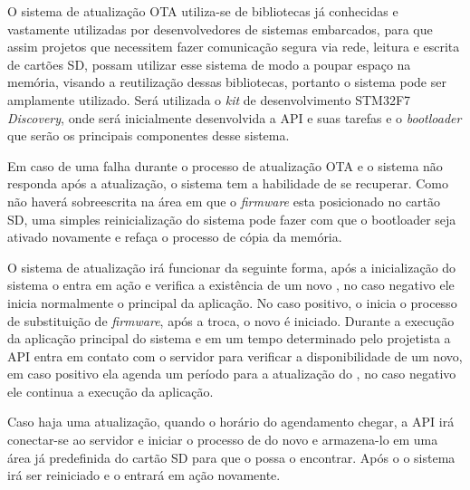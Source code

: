 O sistema de atualização OTA utiliza-se de bibliotecas já conhecidas e vastamente utilizadas por desenvolvedores de sistemas embarcados, para que assim projetos que necessitem fazer comunicação segura via rede, leitura e escrita de cartões SD, possam utilizar esse sistema de modo a poupar espaço na memória, visando a reutilização dessas bibliotecas, portanto o sistema pode ser amplamente utilizado. Será utilizada o \textit{kit} de desenvolvimento STM32F7 \textit{Discovery}, onde será inicialmente desenvolvida a API e suas tarefas e o \textit{bootloader} que serão os principais componentes desse sistema.

Em caso de uma falha durante o processo de atualização OTA e o sistema não responda após a atualização, o sistema tem a habilidade de se recuperar. Como não haverá sobreescrita na área em que o \textit{firmware} esta posicionado no cartão SD, uma simples reinicialização do sistema pode fazer com que o bootloader seja ativado novamente e refaça o processo de cópia da memória.

O sistema de atualização irá funcionar da seguinte forma, após a inicialização do sistema o \bootloader entra em ação e verifica a existência de um novo \firmware, no caso negativo ele inicia normalmente o \software principal da aplicação. No caso positivo, o \bootloader inicia o processo de substituição de \textit{firmware}, após a troca, o novo \software é iniciado. Durante a execução da aplicação principal do sistema e em um tempo determinado pelo projetista a API entra em contato com o servidor para verificar a disponibilidade de um \software novo, em caso positivo ela agenda um período para a atualização do \firmware, no caso negativo ele continua a execução da aplicação. 

Caso haja uma atualização, quando o horário do agendamento chegar, a API irá conectar-se ao servidor e iniciar o processo de \download do \firmware novo e armazena-lo em uma área já predefinida do cartão SD para que o \bootloader possa o encontrar. Após o \download o sistema irá ser reiniciado e o \bootloader entrará em ação novamente. 






